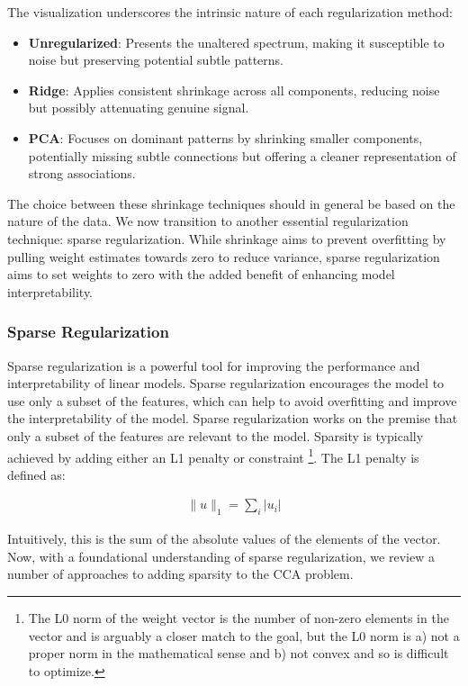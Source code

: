 The visualization underscores the intrinsic nature of each regularization method:
\begin{itemize}
    \item \textbf{Unregularized}: Presents the unaltered spectrum, making it susceptible to noise but preserving potential subtle patterns.
    \item \textbf{Ridge}: Applies consistent shrinkage across all components, reducing noise but possibly attenuating genuine signal.
    \item \textbf{PCA}: Focuses on dominant patterns by shrinking smaller components, potentially missing subtle connections but offering a cleaner representation of strong associations.
\end{itemize}
The choice between these shrinkage techniques should in general be based on the nature of the data.
We now transition to another essential regularization technique: sparse regularization.
While shrinkage aims to prevent overfitting by pulling weight estimates towards zero to reduce variance, sparse regularization aims to set weights to zero with the added benefit of enhancing model interpretability.

\subsubsection{Sparse Regularization}

Sparse regularization is a powerful tool for improving the performance and interpretability of linear models.
Sparse regularization encourages the model to use only a subset of the features, which can help to avoid overfitting and improve the interpretability of the model.
Sparse regularization works on the premise that only a subset of the features are relevant to the model.
Sparsity is typically achieved by adding either an L1 penalty or constraint \footnote{The L0 norm of the weight vector is the number of non-zero elements in the vector and is arguably a closer match to the goal, but the L0 norm is a) not a proper norm in the mathematical sense and b) not convex and so is difficult to optimize.}.
The L1 penalty is defined as:

\begin{align}
    \|u\|_1 = \sum_i |u_i|
\end{align}

Intuitively, this is the sum of the absolute values of the elements of the vector.
Now, with a foundational understanding of sparse regularization, we review a number of approaches to adding sparsity to the CCA problem.

